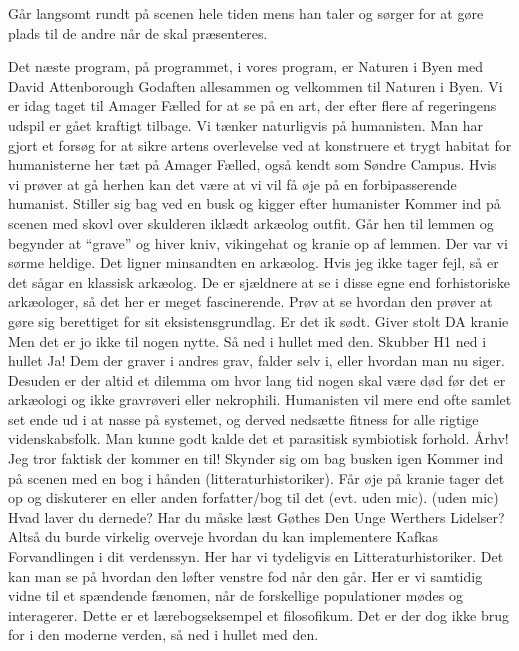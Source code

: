 \documentclass[a4paper,11pt]{article}
\begin{document}
\begin{sketch}
 Går langsomt rundt på scenen hele tiden mens han taler og sørger for at gøre plads til de andre når de skal præsenteres.

 Det næste program, på programmet, i vores program, er Naturen i Byen med David Attenborough
 Godaften allesammen og velkommen til Naturen i Byen. Vi er idag taget til Amager Fælled for at se på en art, der efter flere af regeringens udspil er gået kraftigt tilbage. 
Vi tænker naturligvis på humanisten.
Man har gjort et forsøg for at sikre artens overlevelse ved at konstruere et trygt habitat for humanisterne her tæt på Amager Fælled, også kendt som Søndre Campus. 
Hvis vi prøver at gå herhen kan det være at vi vil få øje på en forbipasserende humanist.
 Stiller sig bag ved en busk og kigger efter humanister
 Kommer ind på scenen med skovl over skulderen iklædt arkæolog outfit. Går hen til lemmen og begynder at “grave” og hiver kniv, vikingehat og kranie op af lemmen.
 Der var vi sørme heldige. Det ligner minsandten en arkæolog. Hvis jeg ikke tager fejl, så er det sågar en klassisk arkæolog. De er sjældnere at se i disse egne end forhistoriske arkæologer, så det her er meget fascinerende. Prøv at se hvordan den prøver at gøre sig berettiget for sit eksistensgrundlag. Er det ik sødt. 
 Giver stolt DA kranie
 Men det er jo ikke til nogen nytte. Så ned i hullet med den. 
 Skubber H1 ned i hullet 
 Ja! Dem der graver i andres grav, falder selv i, eller hvordan man nu siger. Desuden er der altid et dilemma om hvor lang tid nogen skal være død før det er arkæologi og ikke gravrøveri eller nekrophili. 
Humanisten vil mere end ofte samlet set ende ud i at nasse på systemet, og derved nedsætte fitness for alle rigtige videnskabsfolk. Man kunne godt kalde det et parasitisk symbiotisk forhold.
Århv! Jeg tror faktisk der kommer en til!
 Skynder sig om bag busken igen
 Kommer ind på scenen med en bog i hånden (litteraturhistoriker). Får øje på kranie tager det op og diskuterer en eller anden forfatter/bog til det (evt. uden mic).
 (uden mic) Hvad laver du dernede? Har du måske læst Gøthes Den Unge Werthers Lidelser? Altså du burde virkelig overveje hvordan du kan implementere Kafkas Forvandlingen i dit verdenssyn.
 Her har vi tydeligvis en Litteraturhistoriker. Det kan man se på hvordan den løfter venstre fod når den går. Her er vi samtidig vidne til et spændende fænomen, når de forskellige populationer mødes og interagerer. Dette er et lærebogseksempel et filosofikum. Det er der dog ikke brug for i den moderne verden, så ned i hullet med den.

\end{sketch}
\end{document}
